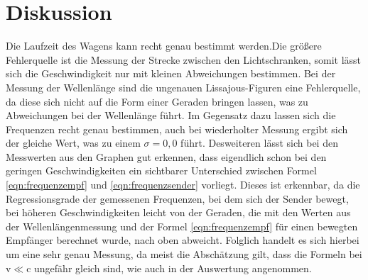 \newpage
\section{Diskussion}
\label{sec:Diskussion}
Die Laufzeit des Wagens kann recht genau bestimmt werden.Die größere Fehlerquelle
ist die Messung der Strecke zwischen den Lichtschranken, somit lässt sich die Geschwindigkeit
nur mit kleinen Abweichungen bestimmen.
Bei der Messung der Wellenlänge sind die ungenauen Lissajous-Figuren eine Fehlerquelle,
da diese sich nicht auf die Form einer Geraden bringen lassen, was zu Abweichungen bei der Wellenlänge
führt. Im Gegensatz dazu lassen sich die Frequenzen recht genau bestimmen, auch bei wiederholter
Messung ergibt sich der gleiche Wert, was zu einem $\sigma=0,0$ führt.
Desweiteren lässt sich bei den Messwerten aus den Graphen gut erkennen, dass eigendlich schon bei den geringen
Geschwindigkeiten ein sichtbarer Unterschied zwischen Formel \ref{eqn:frequenzempf} und \ref{eqn:frequenzsender} vorliegt.
Dieses ist erkennbar, da die Regressionsgrade der gemessenen Frequenzen, bei dem sich der Sender bewegt,
bei höheren Geschwindigkeiten leicht von der Geraden, die mit den Werten
aus der Wellenlängenmessung und der Formel \ref{eqn:frequenzempf} für einen bewegten Empfänger berechnet wurde, nach oben abweicht.
Folglich handelt es sich hierbei um eine sehr genau Messung, da meist die Abschätzung gilt, dass die Formeln bei v$\ll$c ungefähr gleich
sind, wie auch in der Auswertung angenommen.

